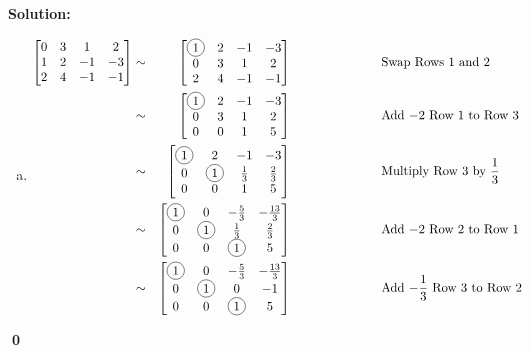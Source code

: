 \documentclass{article}
\newenvironment{solution}
{
  \ignorespaces
  \textbf{Solution:}
}
{
  \ignorespacesafterend
  \begin{flushright}
  {\bfseries \qed}
  \end{flushright}
}
\begin{document}
\begin{solution}
\begin{enumerate}[(a)]
\item
\begin{alignat*}{4}
  \begin{bmatrix}
  0 & 3 & 1 & 2 \\
  1 & 2 & -1 & -3 \\
  2 & 4 & -1 & -1
  \end{bmatrix}
  &\sim&
  \begin{bmatrix}
  \circledNumber{1} & 2 & -1 & -3 \\
  0 & 3 & 1 & 2 \\
  2 & 4 & -1 & -1
  \end{bmatrix} 
  &\hspace{1in} \text{Swap Rows 1 and 2}& \\
  &\sim&
  \begin{bmatrix}
  \circledNumber{1} & 2 & -1 & -3 \\
  0 & 3 & 1 & 2 \\
  0 & 0 & 1 & 5
  \end{bmatrix}
  &\hspace{1in} \text{Add \(-2\) Row 1 to Row 3}& \\
  &\sim&
  \begin{bmatrix}
  \circledNumber{1} & 2 & -1 & -3 \\
  0 & \circledNumber{1} & \frac{1}{3} & \frac{2}{3} \\
  0 & 0 & 1 & 5
  \end{bmatrix} 
  &\hspace{1in} \text{Multiply Row 3 by \(\frac{1}{3}\)}& \\
  &\sim&
  \begin{bmatrix}
  \circledNumber{1} & 0 & -\frac{5}{3} & -\frac{13}{3} \\
  0 & \circledNumber{1} & \frac{1}{3} & \frac{2}{3} \\
  0 & 0 & \circledNumber{1} & 5
  \end{bmatrix}
  &\hspace{1in} \text{Add \(-2\) Row 2 to Row 1}& \\
  &\sim&
  \begin{bmatrix}
  \circledNumber{1} & 0 & -\frac{5}{3} & -\frac{13}{3} \\
  0 & \circledNumber{1} & 0 & -1 \\
  0 & 0 & \circledNumber{1} & 5
  \end{bmatrix}
  &\hspace{1in} \text{Add \(-\frac{1}{3}\) Row 3 to Row 2}& \\

\end{alignat*}
\end{enumerate}
\end{solution}
\end{document}
